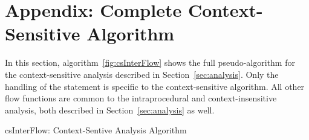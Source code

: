 \section{Appendix: Complete Context-Sensitive Algorithm}\label{app:algo}

In this section, algorithm~\ref{fig:csInterFlow} shows the full
pseudo-algorithm for the context-sensitive analysis described
in Section~\ref{sec:analysis}.
Only the handling of the \callt statement is specific to
the context-sensitive algorithm. All other flow functions
are common to the intraprocedural and context-insensitive
analysis, both described in Section~\ref{sec:analysis} as well.

\begin{algorithm}[!hbtp]
\caption{csInterFlow: Context-Sentive Analysis Algorithm}\label{fig:csInterFlow}
\SetAlgoLined
\LinesNumbered
\DontPrintSemicolon
{}



\end{algorithm}
